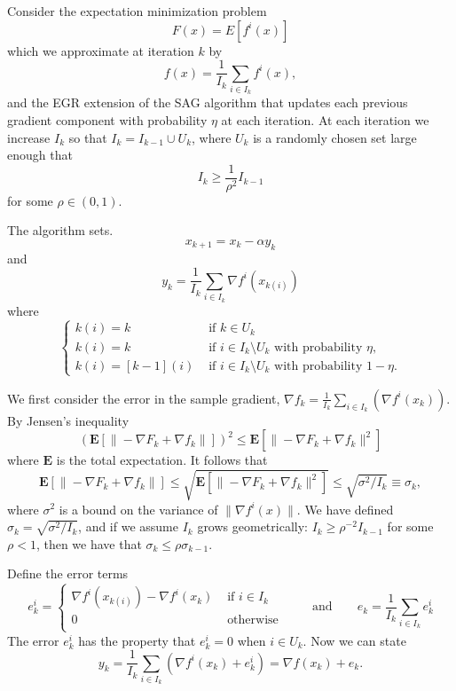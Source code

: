 \documentclass{article}
\begin{document}
\noindent 
Consider the expectation minimization problem 
\[
 F(x) = E[ f^i(x) ]
\]
which we approximate at iteration $k$ by
\[
  f(x) = \frac{1}{I_k}\sum_{i\in I_k} f^i(x),
\]
and the EGR extension of the SAG algorithm that updates each previous gradient component with probability $\eta$ at each iteration.
At each iteration we increase $I_k$ so that $I_k=I_{k-1} \cup U_k$, where $U_k$ is a randomly chosen set large enough that 
\begin{equation}   \label{Igrowth}
 I_k \geq \frac{1}{\rho^2} I_{k-1} 
 \end{equation}
 for some $\rho \in( 0,1)$.

The algorithm sets.
\[
 x_{k+1} = x_k -\alpha y_k
\]
and
\[
 y_k = \frac{1}{I_k}\sum_{i\in I_k}  \nabla f^i(x_{k(i)}) 
\]
where
\[
 \begin{cases}
  k(i)=k &\mbox{ if } k\in U_k \\
  k(i) = k  & \mbox{ if } i \in I_k \setminus U_k \mbox{  with probability }\eta,\\
  k(i) = [k-1](i) &\mbox{ if } i \in I_k \setminus U_k \mbox{ with probability }1-\eta.
 \end{cases}
\]

We first consider the error in the sample gradient, $\nabla f_k = \frac{1}{I_k}\sum_{i\in I_k}(\nabla f^i(x_k))$.
By Jensen's inequality
\[
(\mathbf{E}[\|-\nabla F_{k}+\nabla f_{k} \|])^2 \leq \mathbf{E}[\|-\nabla F_{k}+\nabla f_{k} \|^2] 
\]
where $\mathbf{E}$ is the total expectation. It follows that 
\begin{equation}  \label{truegrad}
\mathbf{E}[\|-\nabla F_{k}+\nabla f_{k} \|] \leq \sqrt {\mathbf{E}[\|-\nabla F_{k}+\nabla f_{k} \|^2] }\leq  \sqrt{\sigma ^2/I_k} \equiv \sigma_k ,
\end{equation}
where $\sigma^2$ is a bound on the variance of $\|\nabla f^i(x)\|$. We have defined $\sigma_k = \sqrt{\sigma ^2 / I_k}$, 
and if  we assume $I_k$ grows geometrically: $I_k \geq \rho^{-2} I_{k-1}$ for some $\rho <1$, then we have that 
$\sigma_k \leq \rho \sigma_{k-1}$.

\bigskip

\noindent
Define the error terms 
\[
 e_k^i =
 \begin{cases}
  \nabla f^i(x_{k(i)})-\nabla f^i(x_k) &\mbox{ if } i \in I_k \\
  0 & \mbox{ otherwise } \\
 \end{cases}
\qquad \mbox{and} \qquad e_k=\frac{1}{{I_k}}\sum_{i\in I_k} e_k^i
\]
The error $e_k^i$ has the property that $e_k^i = 0 $ when $i \in U_k$. Now we can state 
\[
 y_k = \frac{1}{{I_k}}\sum_{i\in I_k} (\nabla f^i(x_k)+e_k^i) = \nabla f(x_k) + e_k.
\]
   
\end{document}
